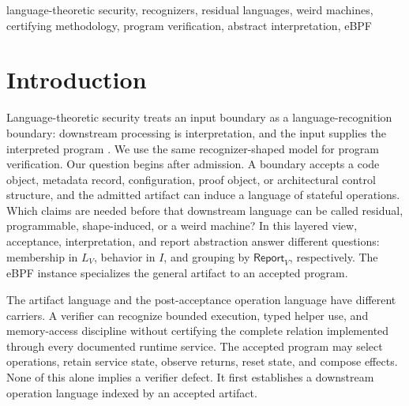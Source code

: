 \documentclass[conference]{IEEEtran}
\begin{document}
\begin{abstract}
For classification, C is the common minimum and P and W form independent refinements. An actor-controllable unintended C witness is an emergent weird machine; adding P gives a programmable weird machine, while adding a linked policy-excluded effect gives a policy-active weird machine. Their intersection, not either branch alone, is required by the narrower report-shape class. A structured retrospective reconstruction of published code-reuse, data-oriented, metadata/proof-model, page-fault, parser, cross-language, cross-layer, interrupt, speculative, microarchitectural, and distributed cases demonstrates why this lattice is necessary. These reconstructions report what the cited sources establish; they are not Definition~2 certificates and do not change the eBPF evidence boundary.
\end{abstract}

\begin{IEEEkeywords}
language-theoretic security, recognizers, residual languages, weird machines, certifying methodology, program verification, abstract interpretation, eBPF
\end{IEEEkeywords}

\section{Introduction}

Language-theoretic security treats an input boundary as a language-recognition boundary: downstream processing is interpretation, and the input supplies the interpreted program \cite{ref1,ref2,ref3,ref4}. We use the same recognizer-shaped model for program verification. Our question begins after admission. A boundary accepts a code object, metadata record, configuration, proof object, or architectural control structure, and the admitted artifact can induce a language of stateful operations. Which claims are needed before that downstream language can be called residual, programmable, shape-induced, or a weird machine? In this layered view, acceptance, interpretation, and report abstraction answer different questions: membership in $L_V$, behavior in $I$, and grouping by $\mathsf{Report}_V$, respectively. The eBPF instance specializes the general artifact to an accepted program.

The artifact language and the post-acceptance operation language have different carriers. A verifier can recognize bounded execution, typed helper use, and memory-access discipline without certifying the complete relation implemented through every documented runtime service. The accepted program may select operations, retain service state, observe returns, reset state, and compose effects. None of this alone implies a verifier defect. It first establishes a downstream operation language indexed by an accepted artifact.
\end{document}

